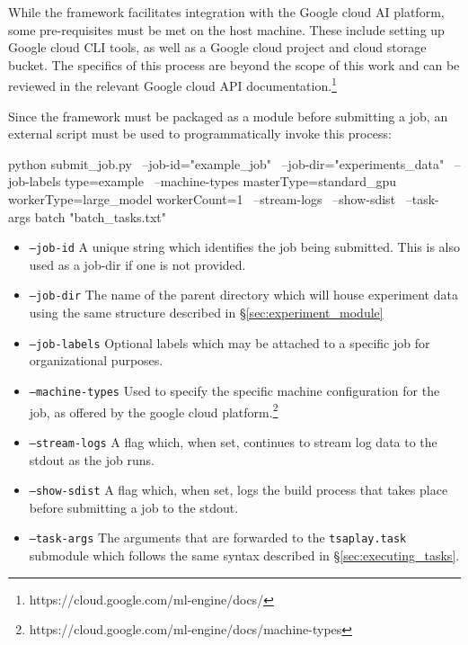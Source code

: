 \documentclass[../../fyp.tex]{subfiles}
\begin{document}
While the framework facilitates integration with the Google cloud AI platform, some pre-requisites must be met on the host machine. These include setting up Google cloud CLI tools, as well as a Google cloud project and cloud storage bucket. The specifics of this process are beyond the scope of this work and can be reviewed in the relevant Google cloud API documentation.\footnote{https://cloud.google.com/ml-engine/docs/}

Since the framework must be packaged as a module before submitting a job, an external script must be used to programmatically invoke this process: 

\begin{code}
	python submit_job.py \ 
		--job-id="example_job" \ 
		--job-dir="experiments_data" \
		--job-labels type=example \
		--machine-types masterType=standard_gpu workerType=large_model workerCount=1 \
		--stream-logs \
		--show-sdist \
		--task-args batch "batch_tasks.txt"
\end{code}

\begin{itemize}
\item \texttt{--job-id} A unique string which identifies the job being submitted. This is also used as a job-dir if one is not provided.
\item \texttt{--job-dir} The name of the parent directory which will house experiment data using the same structure described in \S\ref{sec:experiment_module} 
\item \texttt{--job-labels} Optional labels which may be attached to a specific job for organizational purposes.
\item \texttt{--machine-types} Used to specify the specific machine configuration for the job, as offered by the google cloud platform.\footnote{https://cloud.google.com/ml-engine/docs/machine-types} 
\item \texttt{--stream-logs} A flag which, when set, continues to stream log data to the stdout as the job runs.
\item \texttt{--show-sdist} A flag which, when set, logs the build process that takes place before submitting a job to the stdout.
\item \texttt{--task-args} The arguments that are forwarded to the \texttt{tsaplay.task} submodule which follows the same syntax described in \S\ref{sec:executing_tasks}.
\end{itemize}
\end{document}
